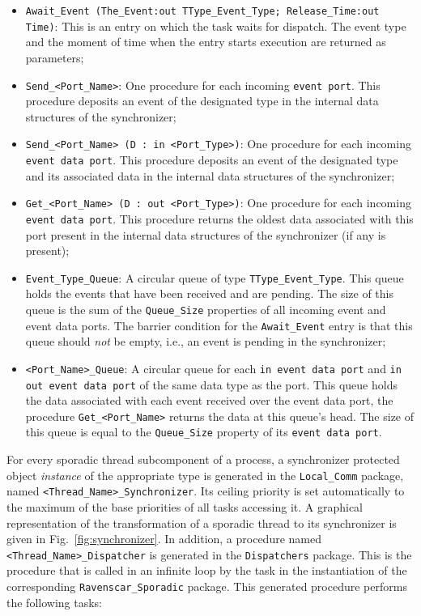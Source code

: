 \begin{itemize}
\item{\texttt{Await\_Event (The\_Event:out TType\_Event\_Type;
    Release\_Time:out Time)}: This is an entry on which the task waits
  for dispatch. The event type and the moment of time when the entry
  starts execution are returned as parameters;}
\item{\texttt{Send\_<Port\_Name>}: One procedure for each incoming
  \texttt{event port}. This procedure deposits an event of the
  designated type in the internal data structures of the
  synchronizer;}
\item{\texttt{Send\_<Port\_Name> (D : in <Port\_Type>)}: One procedure
  for each incoming \texttt{event data port}. This procedure deposits
  an event of the designated type and its associated data in the
  internal data structures of the synchronizer;}
\item{\texttt{Get\_<Port\_Name> (D : out <Port\_Type>)}: One procedure
  for each incoming \texttt{event data port}. This procedure returns
  the oldest data associated with this port present in the internal
  data structures of the synchronizer (if any is present);}
\item{\texttt{Event\_Type\_Queue}: A circular queue of type
  \texttt{TType\_Event\_Type}. This queue holds the events that have
  been received and are pending. The size of this queue is the sum of
  the \texttt{Queue\_Size} properties of all incoming event and event
  data ports. The barrier condition for the \texttt{Await\_Event}
  entry is that this queue should \emph{not} be empty, i.e., an event
  is pending in the synchronizer;}
\item{\texttt{<Port\_Name>\_Queue}: A circular queue for each
  \texttt{in event data port} and \texttt{in out event data port} of
  the same data type as the port. This queue holds the data associated
  with each event received over the event data port, the procedure
  \texttt{Get\_<Port\_Name>} returns the data at this queue's
    head. The size of this queue is equal to the \texttt{Queue\_Size}
    property of its \texttt{event data port}.}
\end{itemize}

For every sporadic thread subcomponent of a process, a synchronizer
protected object \emph{instance} of the appropriate type is generated
in the \texttt{Local\_Comm} package, named
\texttt{<Thread\_Name>\_Synchronizer}. Its ceiling priority is set
automatically to the maximum of the base priorities of all tasks
accessing it. A graphical representation of the transformation of a
sporadic thread to its synchronizer is given in
Fig.~\ref{fig:synchronizer}. In addition, a procedure named
\texttt{<Thread\_Name>\_Dispatcher} is generated in the
\texttt{Dispatchers} package. This is the procedure that is called in
an infinite loop by the task in the instantiation of the corresponding
\texttt{Ravenscar\_Sporadic} package. This generated procedure
performs the following tasks:

